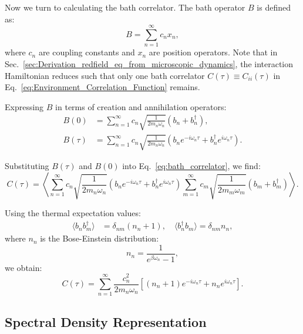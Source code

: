 Now we turn to calculating the bath correlator.
The bath operator \( B \) is defined as:
\begin{equation} \label{eq:bath_operator}
B = \sum_{n=1}^{\infty} c_n x_n,
\end{equation}
where \( c_n \) are coupling constants and \( x_n \) are position operators. Note that in Sec.~\ref{sec:Derivation_redfield_eq_from_microscopic_dynamics}, the interaction Hamiltonian reduces such that only one bath correlator \( C(\tau) \equiv C_{ii}(\tau) \) in Eq.~\eqref{eq:Environment_Correlation_Function} remains.

Expressing \( B \) in terms of creation and annihilation operators:
\begin{align}
B(0) &= \sum_{n=1}^{\infty} c_n \sqrt{\frac{1}{2 m_n \omega_n}} (b_n + b_n^\dagger), \label{eq:bath_operator_t0} \\
B(\tau) &= \sum_{n=1}^{\infty} c_n \sqrt{\frac{1}{2 m_n \omega_n}} \left( b_n e^{-i \omega_n \tau} + b_n^\dagger e^{i \omega_n \tau} \right). \label{eq:bath_operator_tau}
\end{align}

Substituting \( B(\tau) \) and \( B(0) \) into Eq.~\eqref{eq:bath_correlator}, we find:
\begin{equation} \label{eq:correlator_substitution}
C(\tau) = \left\langle \sum_{n=1}^{\infty} c_n \sqrt{\frac{1}{2 m_n \omega_n}} (b_n e^{-i \omega_n \tau} + b_n^\dagger e^{i \omega_n \tau}) \sum_{m=1}^{\infty} c_m \sqrt{\frac{1}{2 m_m \omega_m}} (b_m + b_m^\dagger) \right\rangle.
\end{equation}

Using the thermal expectation values:
\begin{align} \label{eq:thermal_expectations}
\langle b_n b_m^\dagger \rangle &= \delta_{nm} (n_n + 1), \quad \langle b_n^\dagger b_m \rangle = \delta_{nm} n_n,
\end{align}
where \( n_n \) is the Bose-Einstein distribution:
\begin{equation} \label{eq:bose_einstein_distribution}
n_n = \frac{1}{e^{\beta \omega_n} - 1},
\end{equation}
we obtain:
\begin{equation} \label{eq:correlator_result}
C(\tau) = \sum_{n=1}^{\infty} \frac{c_n^2}{2 m_n \omega_n} \left[ (n_n + 1) e^{-i \omega_n \tau} + n_n e^{i \omega_n \tau} \right].
\end{equation}

\subsection{Spectral Density Representation}
\label{subsec:spectral_density}

